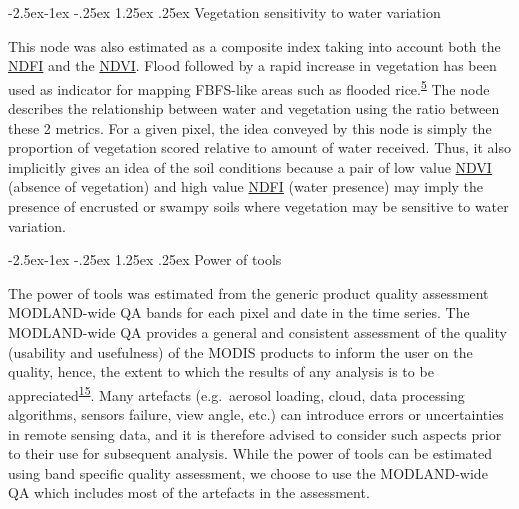 \documentclass[12pt,oneside]{article}
\makeatletter
\renewcommand\paragraph{\@startsection{paragraph}{4}{\z@}%
            {-2.5ex\@plus -1ex \@minus -.25ex}%
            {1.25ex \@plus .25ex}%
            {\normalfont\normalsize\bfseries}}
\makeatother
\begin{document}
\hypertarget{I524}{%
\paragraph{Vegetation sensitivity to water variation}\label{I524}}

This node was also estimated as a composite index taking into account both the \href{http://journals.plos.org/plosone/article/file?id=10.1371/journal.pone.0088741\&type=printable}{NDFI} and the \href{https://www.sciencedirect.com/science/article/pii/0034425779900130?via\%3Dihub}{NDVI}. Flood followed by a rapid increase in vegetation has been used as indicator for mapping FBFS-like areas such as flooded rice.\textsuperscript{\protect\hyperlink{ref-Boschetti_et_al_2014}{5}} The node describes the relationship between water and vegetation using the ratio between these 2 metrics. For a given pixel, the idea conveyed by this node is simply the proportion of vegetation scored relative to amount of water received. Thus, it also implicitly gives an idea of the soil conditions because a pair of low value \href{https://www.sciencedirect.com/science/article/pii/0034425779900130?via\%3Dihub}{NDVI} (absence of vegetation) and high value \href{http://journals.plos.org/plosone/article/file?id=10.1371/journal.pone.0088741\&type=printable}{NDFI} (water presence) may imply the presence of encrusted or swampy soils where vegetation may be sensitive to water variation.

\hypertarget{I525}{%
\paragraph{Power of tools}\label{I525}}

The power of tools was estimated from the generic product quality assessment MODLAND-wide QA bands for each pixel and date in the time series. The MODLAND-wide QA provides a general and consistent assessment of the quality (usability and usefulness) of the MODIS products to inform the user on the quality, hence, the extent to which the results of any analysis is to be appreciated\textsuperscript{\protect\hyperlink{ref-Roy_et_al_2002}{15}}. Many artefacts (e.g.~aerosol loading, cloud, data processing algorithms, sensors failure, view angle, etc.) can introduce errors or uncertainties in remote sensing data, and it is therefore advised to consider such aspects prior to their use for subsequent analysis. While the power of tools can be estimated using band specific quality assessment, we choose to use the MODLAND-wide QA which includes most of the artefacts in the assessment.
\end{document}
